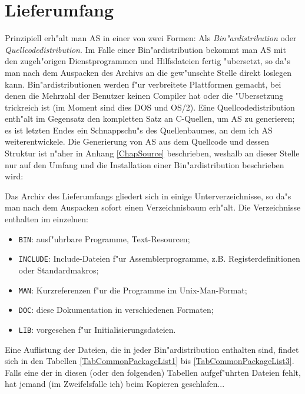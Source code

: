 \documentclass[12pt,a4paper,twoside]{report}
\begin{document}

\section{Lieferumfang}

Prinzipiell erh"alt man AS in einer von zwei Formen: Als {\em
Bin"ardistribution} oder {\em Quellcodedistribution}.  Im Falle einer
Bin"ardistribution bekommt man AS mit den zugeh"origen Dienstprogrammen
und Hilfsdateien fertig "ubersetzt, so da"s man nach dem Auspacken des
Archivs an die gew"unschte Stelle direkt loslegen kann. 
Bin"ardistributionen werden f"ur verbreitete Plattformen gemacht, bei
denen die Mehrzahl der Benutzer keinen Compiler hat oder die "Ubersetzung
trickreich ist (im Moment sind dies DOS und OS/2).  Eine
Quellcodedistribution enth"alt im Gegensatz den kompletten Satz an
C-Quellen, um AS zu generieren; es ist letzten Endes ein Schnappschu"s
des Quellenbaumes, an dem ich AS weiterentwickele.  Die Generierung von AS
aus dem Quellcode und dessen Struktur ist n"aher in Anhang
\ref{ChapSource} beschrieben, weshalb an dieser Stelle nur auf den
Umfang und die Installation einer Bin"ardistribution beschrieben wird:

Das Archiv des Lieferumfangs gliedert sich in einige Unterverzeichnisse,
so da"s man nach dem Auspacken sofort einen Verzeichnisbaum erh"alt.  Die
Verzeichnisse enthalten im einzelnen:
\begin{itemize}
\item{{\tt BIN}: ausf"uhrbare Programme, Text-Resourcen;}
\item{{\tt INCLUDE}: Include-Dateien f"ur Assemblerprogramme, z.B.
      Registerdefinitionen oder Standardmakros;}
\item{{\tt MAN}: Kurzreferenzen f"ur die Programme im Unix-Man-Format;}
\item{{\tt DOC}: diese Dokumentation in verschiedenen Formaten;}
\item{{\tt LIB}: vorgesehen f"ur Initialisierungsdateien.}
\end{itemize}
Eine Auflistung der Dateien, die in jeder Bin"ardistribution enthalten
sind, findet sich in den Tabellen \ref{TabCommonPackageList1} bis
\ref{TabCommonPackageList3}.  Falls eine der in diesen (oder den
folgenden) Tabellen aufgef"uhrten Dateien fehlt, hat jemand (im
Zweifelsfalle ich) beim Kopieren geschlafen...
\end{document}
